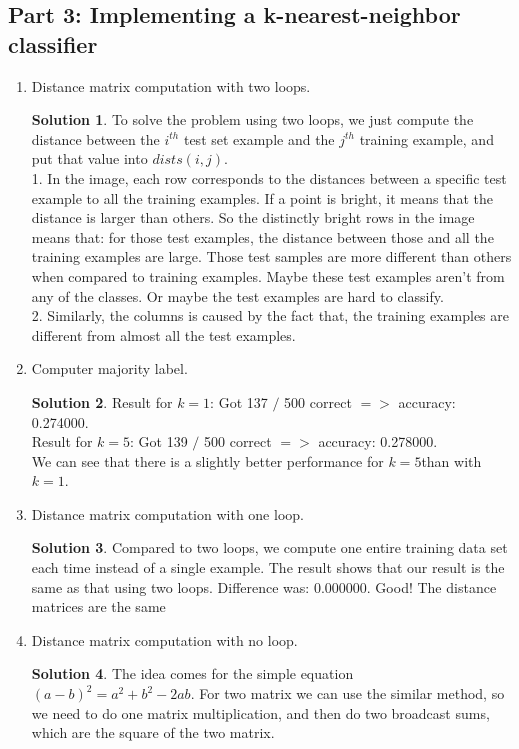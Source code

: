 \documentclass[]{book}
\theoremstyle{definition}
\newtheorem*{soln}{Solution}
\begin{document}
\subsection*{Part 3: Implementing a k-nearest-neighbor classifier}
\begin{enumerate}
	\item Distance matrix computation with two loops.
	\begin{soln}
		To solve the problem using two loops, we just compute the distance between the $i^{th}$ test set example and the $j^{th}$ training example, and put that value into $dists(i,j)$.\\
		1. In the image, each row corresponds to the distances between a specific test example to all the training examples. If a point is bright, it means that the distance is larger than others. So the distinctly bright rows in the image means that: for those test examples, the distance between those and all the training examples are large. Those test samples are more different than others when compared to training examples. Maybe these test examples aren't from any of the classes. Or maybe the test examples are hard to classify.\\
		2. Similarly, the columns is caused by the fact that, the training examples are different from almost all the test examples.
	\end{soln}
	\item Computer majority label.
	\begin{soln}
		Result for $k = 1$: Got 137 $/$ 500 correct $=>$ accuracy: 0.274000.\\
		Result for $k = 5$: Got 139 $/$ 500 correct $=>$ accuracy: 0.278000.\\
		We can see that there is a slightly better performance for $k = 5$than with $k = 1$.
		\end{soln}
	\item Distance matrix computation with one loop.
	\begin{soln}
		Compared to two loops, we compute one entire training data set each time instead of a single example. The result shows that our result is the same as that using two loops. Difference was: 0.000000. Good! The distance matrices are the same 
	\end{soln}
	\item Distance matrix computation with no loop.
	\begin{soln}
		The idea comes for the simple equation $(a-b)^2 = a^2 + b^2 - 2 ab$. For two matrix we can use the similar method, so we need to do one matrix multiplication, and then do two broadcast sums, which are the square of the two matrix.\\

\end{soln}
\end{enumerate}
\end{document}
